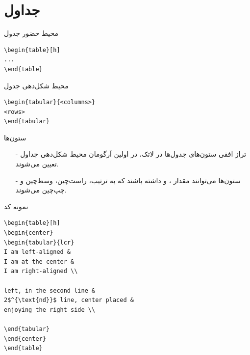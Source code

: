 \section{جداول}
\begin{frame}[fragile]{محیط حضور جدول}
\begin{latin}
\begin{lstlisting}[keywords={begin, end}, keywordstyle=\color{Mulberry}\textbf]
\begin{table}[h]
...
\end{table}
\end{lstlisting}
\end{latin}
\end{frame}

\begin{frame}[fragile]{محیط شکل‌دهی جدول}
\begin{latin}
\begin{lstlisting}[keywords={begin, end}, keywordstyle=\color{Mulberry}\textbf]
\begin{tabular}{<columns>}
<rows>
\end{tabular}
\end{lstlisting}
\end{latin}
\end{frame}

\begin{frame}{ستون‌ها}
\begin{itemize}\itemr
\item[-]
تراز افقی ستون‌های جدول‌‌ها در لاتک، در اولین آرگومان محیط‌ شکل‌دهی جداول تعیین می‌شوند.

\item[-]
ستون‌ها می‌توانند مقدار 
،
و 
داشته باشند که به ترتیب، راست‌چین، وسط‌چین و چپ‌چین می‌شوند.
\end{itemize}
\end{frame}

\begin{frame}[fragile]{نمونه کد}
\begin{latin}
\begin{lstlisting}[keywords={begin, end}, keywordstyle=\color{Mulberry}\textbf]
\begin{table}[h]
\begin{center}
\begin{tabular}{lcr}
I am left-aligned & 
I am at the center & 
I am right-aligned \\

left, in the second line &
2$^{\text{nd}}$ line, center placed &
enjoying the right side \\

\end{tabular}
\end{center}
\end{table}
\end{lstlisting}
\end{latin}
\end{frame}

